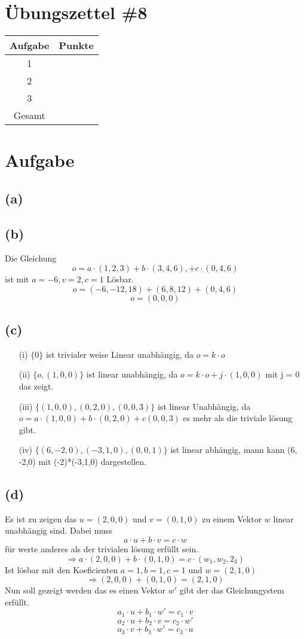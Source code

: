 \documentclass{article}
\begin{document}
\section*{Übungszettel \#8} %

\begin{center}
    \begin{tabular}{|c|c|}
        \hline
        Aufgabe & Punkte \\
        \hline
        1 & \\
        2 & \\
        3 & \\
        \hline
        Gesamt & \\
        \hline
    \end{tabular}
\end{center}

\section{Aufgabe}
\subsection*{(a)}
\subsection*{(b)} 
Die Gleichung 
\[o = a \cdot (1,2,3) + b\cdot (3,4,6), +c\cdot(0,4,6)\]
ist mit \(a = -6, v = 2, c = 1\) Lösbar.
\[o = (-6,-12,18) + (6,8,12) + (0,4,6)\]
\[o = (0,0,0)\]
\subsection*{(c)}
\begin{itemize}
    \item [(i)] \(\{0\}\) ist trivialer weise Linear unabhängig, da \(o = k \cdot o\)
    \item [(ii)] \(\{o, (1,0,0)\}\) ist linear unabhängig, da \(o = k \cdot o + j \cdot (1,0,0)\) mit j = 0 das zeigt.
    \item [(iii)] \(\{(1,0,0),(0,2,0), (0,0,3)\}\) ist linear Unabhängig, da \(o = a \cdot (1,0,0) + b \cdot (0,2,0) + c (0,0,3)\) es mehr als die triviale lösung gibt. 
    \item [(iv)] \(\{(6, -2,0), (-3,1,0), (0,0,1)\}\) ist linear abhängig, mann kann (6, -2,0) mit (-2)*(-3,1,0) dargestellen.
\end{itemize}
\subsection*{(d)}
Es ist zu zeigen das \(u = (2, 0, 0)\) und \(v = (0, 1, 0)\) zu einem Vektor \(w\) linear unabhängig sind. Dabei muss
\[a \cdot u + b \cdot v = c \cdot w\]
für werte anderes als der trivialen lösung erfüllt sein.
\[ \Rightarrow a \cdot (2,0,0) + b \cdot (0,1,0) = c \cdot (w_1, w_2, 2_3)\]
Ist lösbar mit den Koeficienten \(a = 1, b = 1, c = 1\) und \(w = (2, 1, 0)\)
\[ \Rightarrow  (2,0,0) + (0,1,0) = (2, 1, 0)\]
Nun soll gezeigt werden das es einen Vektor \(w'\) gibt der das Gleichungystem erfüllt.
\[a_1 \cdot u + b_1 \cdot w' = c_1 \cdot v\]
\[a_2 \cdot u + b_2 \cdot v = c_2 \cdot w'\]
\[a_3 \cdot v + b_3 \cdot w' = c_3 \cdot u\]
\end{document}
